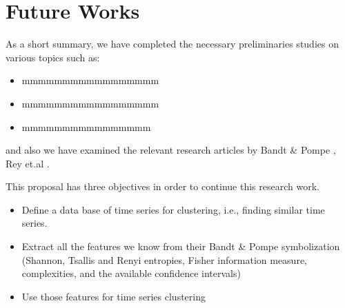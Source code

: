 \chapter{Future Works}\label{C:futw}

As a short summary, we have completed the necessary preliminaries studies on various topics such as:
\begin{itemize}
    \item mmmmmmmmmmmmmmmmm
    \item mmmmmmmmmmmmmmmmm
    \item mmmmmmmmmmmmmmmm
\end{itemize}

and also we have examined the relevant research articles by Bandt \& Pompe \cite{PhysRevLett.88.174102}, Rey et.al \cite{Rey2023a,Rey2023}.


This proposal has three objectives in order to continue this research work.
\begin{itemize}
	\item Define a data base of time series for clustering, i.e., finding similar time series. 
	\item Extract all the features we know from their Bandt \& Pompe symbolization (Shannon, Tsallis and Renyi entropies, Fisher information measure, complexities, and the available confidence intervals)
	\item Use those features for time series clustering 
\end{itemize} 